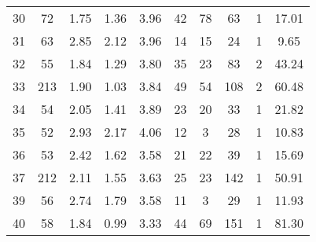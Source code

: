 \begin{tabular}{lccccccccc}
30 &       72 &                             1.75 &                             1.36 &                             3.96 &              42 &              78 &                        63 &          1 &                        17.01 \\
31 &       63 &                             2.85 &                             2.12 &                             3.96 &              14 &              15 &                        24 &          1 &                         9.65 \\
32 &       55 &                             1.84 &                             1.29 &                             3.80 &              35 &              23 &                        83 &          2 &                        43.24 \\
33 &      213 &                             1.90 &                             1.03 &                             3.84 &              49 &              54 &                       108 &          2 &                        60.48 \\
34 &       54 &                             2.05 &                             1.41 &                             3.89 &              23 &              20 &                        33 &          1 &                        21.82 \\
35 &       52 &                             2.93 &                             2.17 &                             4.06 &              12 &               3 &                        28 &          1 &                        10.83 \\
36 &       53 &                             2.42 &                             1.62 &                             3.58 &              21 &              22 &                        39 &          1 &                        15.69 \\
37 &      212 &                             2.11 &                             1.55 &                             3.63 &              25 &              23 &                       142 &          1 &                        50.91 \\
39 &       56 &                             2.74 &                             1.79 &                             3.58 &              11 &               3 &                        29 &          1 &                        11.93 \\
40 &       58 &                             1.84 &                             0.99 &                             3.33 &              44 &              69 &                       151 &          1 &                        81.30 \\

\end{tabular}
